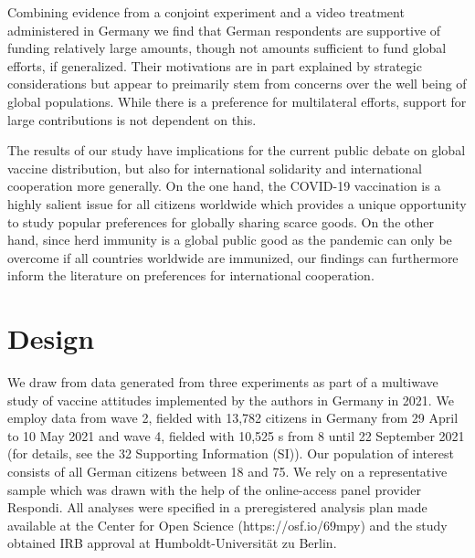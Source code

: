 \documentclass[12pt,oneside,smallheadings,chapterprefix=true]{article}
\begin{document}
Combining evidence from a conjoint experiment and a video treatment administered in Germany we find that German respondents are supportive of funding relatively large amounts, though not amounts sufficient to fund global efforts, if generalized. Their motivations are in part explained by strategic considerations but appear to preimarily stem from concerns over the well being of global populations. While there is a preference for multilateral efforts, support for large contributions is not dependent on this. 

The results of our study have  implications for the current public debate on global vaccine distribution, but also for international solidarity and international cooperation more generally. On the one hand, the COVID-19 vaccination is a highly salient issue for all citizens worldwide which provides a unique opportunity to study popular preferences for globally sharing scarce goods. On the other hand, since herd immunity is a global public good as the pandemic can only be overcome if all countries worldwide are immunized, our findings can furthermore inform the literature on preferences for international cooperation. 




\section*{Design}
\label{sec:design}

We draw from data generated from three experiments as part of a multiwave study of vaccine attitudes implemented by the authors in Germany in 2021. We employ data from wave 2, fielded with 13,782 citizens in Germany from 29 April to 10 May 2021 and wave 4, fielded with 10,525 s from 8 until 22 September 2021 (for details, see the 32 Supporting Information (SI)). Our population of interest consists of all German citizens between 18 and 75. We rely on a representative sample which was drawn with the help of the online-access panel provider \hspace{0pt}Respondi\hspace{0pt}\hspace{0pt}. All analyses were specified in a preregistered analysis plan made available at the Center for Open Science (https://osf.io/69mpy) and the study obtained IRB approval at Humboldt-Universität zu Berlin.
  
\end{document}

